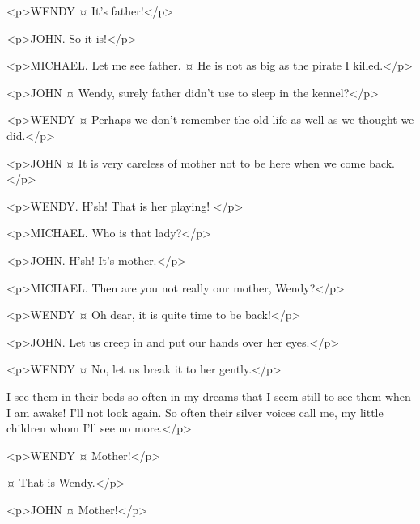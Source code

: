 \begin{drama}
<p>WENDY ¤
It's father!</p>

<p>JOHN. So it is!</p>

<p>MICHAEL. Let me see father.
¤
He is not as big as the pirate I killed.</p>

<p>JOHN ¤
Wendy, surely father didn't use to sleep in the kennel?</p>

<p>WENDY ¤
Perhaps we don't remember the old life as well as we thought we did.</p>

<p>JOHN ¤
It is very careless of mother not to be here when we come back.</p>


<p>WENDY. H'sh!
That is her playing!
</p>

<p>MICHAEL. Who is that lady?</p>

<p>JOHN. H'sh! It's mother.</p>

<p>MICHAEL. Then are you not really our mother, Wendy?</p>

<p>WENDY ¤
Oh dear, it is quite time to be back!</p>

<p>JOHN. Let us creep in and put our hands over her eyes.</p>

<p>WENDY ¤
No, let us break it to her gently.</p>


\mrsdarlingspeaks
I see them in their beds so often in my dreams that I seem still to see them when I am awake! I'll not look again.
So often their silver voices call me, my little children whom I'll see no more.</p>


<p>WENDY ¤
Mother!</p>

\mrsdarlingspeaks {}¤
That is Wendy.</p>

<p>JOHN ¤
Mother!</p>


\end{drama}
